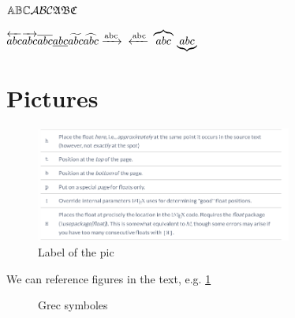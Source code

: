 \documentclass{article}
\begin{document}
$
\mathbb{ABC}   \\  %
\mathcal{ABC}   \\ %
\mathfrak{ABC} \\ %
 $ 
 
$
\overleftarrow{abc} \\
\overrightarrow{abc} \\
\overline{abc} \\
 \underline{abc} \\
\widetilde{abc} \\
 \widehat{abc} \\
\xrightarrow{\text{abc}} \\
\xleftarrow{\text{abc}} \\
 \overbrace{abc}  \\
\underbrace{abc}
$




\section{Pictures}

\begin{figure}[htb]
\begin{center}
\includegraphics[width=0.75\textwidth]{figures/caption.png}
\end{center}
\caption{Label of the pic}
\label{pic} %
\end{figure}
We can reference figures in the text, e.g. \ref{pic}

\begin{figure}[H]
\centerline {}
\caption{Grec symboles}
\label{pic2}
\end{figure}
\end{document}
